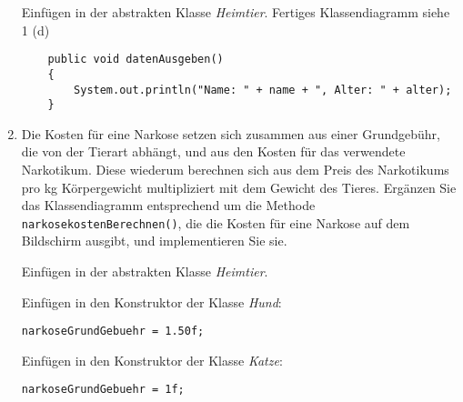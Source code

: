 \documentclass{bschlangaul-aufgabe}
\begin{document}
\begin{enumerate}
\begin{bAntwort}
Einfügen in der abstrakten Klasse \emph{Heimtier}. Fertiges
Klassendiagramm siehe 1 (d)

\begin{verbatim}
    public void datenAusgeben()
    {
        System.out.println("Name: " + name + ", Alter: " + alter);
    }
\end{verbatim}
\end{bAntwort}


\item Die Kosten für eine Narkose setzen sich zusammen aus einer
Grundgebühr, die von der Tierart abhängt, und aus den Kosten für das
verwendete Narkotikum. Diese wiederum berechnen sich aus dem Preis des
Narkotikums pro kg Körpergewicht multipliziert mit dem Gewicht des
Tieres. Ergänzen Sie das Klassendiagramm entsprechend um die Methode
\verb|narkosekostenBerechnen()|, die die Kosten für eine Narkose auf dem
Bildschirm ausgibt, und implementieren Sie sie.


\begin{bAntwort}
Einfügen in der abstrakten Klasse \emph{Heimtier}.


Einfügen in den Konstruktor der Klasse \emph{Hund}:
\begin{verbatim}
narkoseGrundGebuehr = 1.50f;
\end{verbatim}

Einfügen in den Konstruktor der Klasse \emph{Katze}:
\begin{verbatim}
narkoseGrundGebuehr = 1f;
\end{verbatim}


\end{bAntwort}
\end{enumerate}
\end{document}

